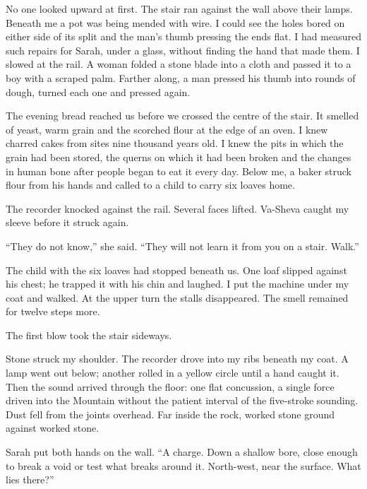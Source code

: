 No one looked upward at first. The stair ran against the wall above their lamps. Beneath me a pot was being mended with wire. I could see the holes bored on either side of its split and the man's thumb pressing the ends flat. I had measured such repairs for Sarah, under a glass, without finding the hand that made them. I slowed at the rail. A woman folded a stone blade into a cloth and passed it to a boy with a scraped palm. Farther along, a man pressed his thumb into rounds of dough, turned each one and pressed again.\par

The evening bread reached us before we crossed the centre of the stair. It smelled of yeast, warm grain and the scorched flour at the edge of an oven. I knew charred cakes from sites nine thousand years old. I knew the pits in which the grain had been stored, the querns on which it had been broken and the changes in human bone after people began to eat it every day. Below me, a baker struck flour from his hands and called to a child to carry six loaves home.\par

The recorder knocked against the rail. Several faces lifted. Va-Sheva caught my sleeve before it struck again.\par

``They do not know,'' she said. ``They will not learn it from you on a stair. Walk.''\par

The child with the six loaves had stopped beneath us. One loaf slipped against his chest; he trapped it with his chin and laughed. I put the machine under my coat and walked. At the upper turn the stalls disappeared. The smell remained for twelve steps more.\par

\ornament

The first blow took the stair sideways.\par

Stone struck my shoulder. The recorder drove into my ribs beneath my coat. A lamp went out below; another rolled in a yellow circle until a hand caught it. Then the sound arrived through the floor: one flat concussion, a single force driven into the Mountain without the patient interval of the five-stroke sounding. Dust fell from the joints overhead. Far inside the rock, worked stone ground against worked stone.\par

Sarah put both hands on the wall. ``A charge. Down a shallow bore, close enough to break a void or test what breaks around it. North-west, near the surface. What lies there?''\par

